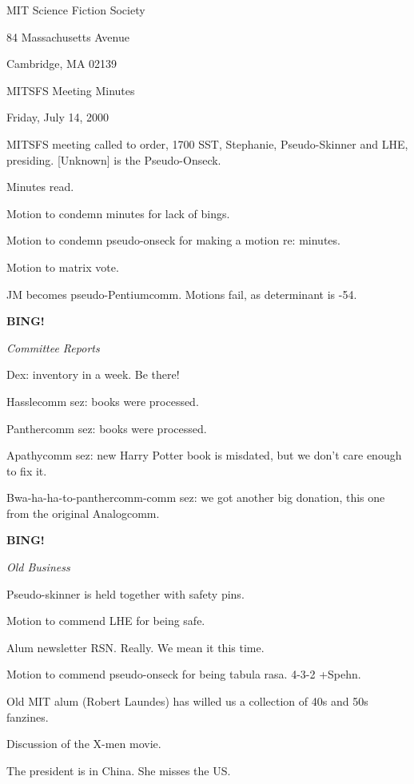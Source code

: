 \documentclass[12pt]{article}
\newcommand{\bing}{{\bf BING!} }
\newcommand{\goto}[1]{\bing \vskip 12pt \centerline{{\em{#1}}}}
\begin{document}
\begin{center}

MIT Science Fiction Society 

84 Massachusetts Avenue

Cambridge, MA 02139

\vspace{12pt}

MITSFS Meeting Minutes 

Friday, July 14, 2000

\end{center}
 
\vspace{18pt}

\setlength{\parskip}{6pt}

\noindent
MITSFS meeting called to order, 1700 SST, Stephanie, Pseudo-Skinner and LHE, presiding. [Unknown] is the Pseudo-Onseck.

Minutes read.

Motion to condemn minutes for lack of bings.

Motion to condemn pseudo-onseck for making a motion re: minutes.

Motion to matrix vote.

JM becomes pseudo-Pentiumcomm. Motions fail, as determinant is -54.

\goto{Committee Reports}

Dex: inventory in a week. Be there!

Hasslecomm sez: books were processed.

Panthercomm sez: books were processed.

Apathycomm sez: new Harry Potter book is misdated, but we don't care enough to fix it.

Bwa-ha-ha-to-panthercomm-comm sez: we got another big donation, this one from the original Analogcomm.

\goto{Old Business}

Pseudo-skinner is held together with safety pins.

Motion to commend LHE for being safe.

Alum newsletter RSN. Really. We mean it this time.

Motion to commend pseudo-onseck for being tabula rasa. 4-3-2 +Spehn.

Old MIT alum (Robert Laundes) has willed us a collection of 40s and 50s fanzines.

Discussion of the X-men movie.

The president is in China. She misses the US.
\end{document}
